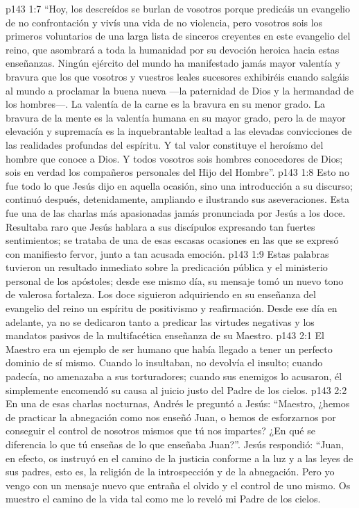 \vs p143 1:7 “Hoy, los descreídos se burlan de vosotros porque predicáis un evangelio de no confrontación y vivís una vida de no violencia, pero vosotros sois los primeros voluntarios de una larga lista de sinceros creyentes en este evangelio del reino, que asombrará a toda la humanidad por su devoción heroica hacia estas enseñanzas. Ningún ejército del mundo ha manifestado jamás mayor valentía y bravura que los que vosotros y vuestros leales sucesores exhibiréis cuando salgáis al mundo a proclamar la buena nueva ---la paternidad de Dios y la hermandad de los hombres---. La valentía de la carne es la bravura en su menor grado. La bravura de la mente es la valentía humana en su mayor grado, pero la de mayor elevación y supremacía es la inquebrantable lealtad a las elevadas convicciones de las realidades profundas del espíritu. Y tal valor constituye el heroísmo del hombre que conoce a Dios. Y todos vosotros sois hombres conocedores de Dios; sois en verdad los compañeros personales del Hijo del Hombre”.
\vs p143 1:8 \pc Esto no fue todo lo que Jesús dijo en aquella ocasión, sino una introducción a su discurso; continuó después, detenidamente, ampliando e ilustrando sus aseveraciones. Esta fue una de las charlas más apasionadas jamás pronunciada por Jesús a los doce. Resultaba raro que Jesús hablara a sus discípulos expresando tan fuertes sentimientos; se trataba de una de esas escasas ocasiones en las que se expresó con manifiesto fervor, junto a tan acusada emoción.
\vs p143 1:9 \pc Estas palabras tuvieron un resultado inmediato sobre la predicación pública y el ministerio personal de los apóstoles; desde ese mismo día, su mensaje tomó un nuevo tono de valerosa fortaleza. Los doce siguieron adquiriendo en su enseñanza del evangelio del reino un espíritu de positivismo y reafirmación. Desde ese día en adelante, ya no se dedicaron tanto a predicar las virtudes negativas y los mandatos pasivos de la multifacética enseñanza de su Maestro.
\vs p143 2:1 El Maestro era un ejemplo de ser humano que había llegado a tener un perfecto dominio de sí mismo. Cuando lo insultaban, no devolvía el insulto; cuando padecía, no amenazaba a sus torturadores; cuando sus enemigos lo acusaron, él simplemente encomendó su causa al juicio justo del Padre de los cielos.
\vs p143 2:2 \pc En una de esas charlas nocturnas, Andrés le preguntó a Jesús: “Maestro, ¿hemos de practicar la abnegación como nos enseñó Juan, o hemos de esforzarnos por conseguir el control de nosotros mismos que tú nos impartes? ¿En qué se diferencia lo que tú enseñas de lo que enseñaba Juan?”. Jesús respondió: “Juan, en efecto, os instruyó en el camino de la justicia conforme a la luz y a las leyes de sus padres, esto es, la religión de la introspección y de la abnegación. Pero yo vengo con un mensaje nuevo que entraña el olvido y el control de uno mismo. Os muestro el camino de la vida tal como me lo reveló mi Padre de los cielos.
